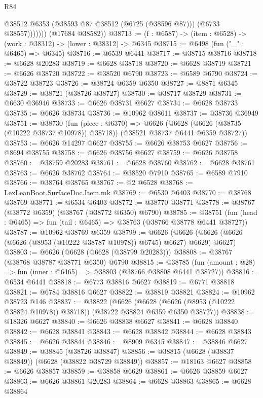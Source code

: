 \begin{lexlean}{R84}
\begin{coremodule}
                  @38512
                  @6353
                  (@38593 @87 @38512 (@6725 (@38596 @87)))
                  (@6733 @38557)))))))
      (@17684 @38582))
@38713 := (f : @6587) -> (item : @6528) -> (work : @38312) -> (lower : @38312) -> @6345
@38715 := @6498 (fun ("_" : @6465) => @6345)
@38716 := @6539 @6441
@38717 := @38715 @38716
@38718 := @6628 @20283
@38719 := @6628 @38718
@38720 := @6628 @38719
@38721 := @6626 @38720
@38722 := @38520 @6790
@38723 := @6589 @6790
@38724 := @38722 @38723
@38726 := @38724 @6359 @6350
@38727 := @8871 @6345
@38729 := @38721 (@38726 @38727)
@38730 := @38717 @38729
@38731 := @6630 @36946
@38733 := @6626 @38731 @6627
@38734 := @6628 @38733
@38735 := @6626 @38734
@38736 := @10962 @38611
@38737 := @38736 @36949
@38751 := @38730
    (fun (piece : @6370) =>
    @6626 (@6628 (@6626 (@38735 (@10222 @38737 @10978)) @38718)) (@38521 @38737 @6441 @6359 @38727))
@38753 := @6626 @14297 @6627
@38755 := @6626 @38753 @6627
@38756 := @8694 @38755
@38758 := @6626 @38756 @6627
@38759 := @6626 @38758
@38760 := @38759 @20283
@38761 := @6628 @38760
@38762 := @6628 @38761
@38763 := @6626 @38762
@38764 := @38520 @7910
@38765 := @6589 @7910
@38766 := @38764 @38765
@38767 := @2 @6528
@38768 := LexLeanBoot.SurfaceDoc.Item.mk
@38769 := @6530 @6403
@38770 := @38768 @38769
@38771 := @6534 @6403
@38772 := @38770 @38771
@38778 := @38767 (@38772 @6359) (@38767 (@38772 @6350) @6790)
@38785 := @38751 (fun (head : @6465) => fun (tail : @6465) => @38763 (@38766 @38778 @6441 @38727))
@38787 := @10962 @38769 @6359
@38799 := @6626
    (@6626 (@6626 (@6626 (@6626 (@8953 (@10222 @38787 @10978)) @6745) @6627) @6629) @6627)
@38803 := @6626 (@6628 (@6628 (@38799 @20283)))
@38808 := @38767 (@38768 @38787 @38771 @6350) @6790
@38815 := @38785 (fun (amount : @28) => fun (inner : @6465) => @38803 (@38766 @38808 @6441 @38727))
@38816 := @6534 @6441
@38818 := @6773 @38816 @6627
@38819 := @6771 @38818
@38821 := @6784 @38816 @6627
@38822 := @38819 @38821
@38824 := @10962 @38723 @146
@38837 := @38822
    (@6626 (@6628 (@6626 (@8953 (@10222 @38824 @10978)) @38718)) (@38722 @38824 @6359 @6350 @38727))
@38838 := @18326 @6627
@38840 := @6626 @38838 @6627
@38841 := @6628 @38840
@38842 := @6628 @38841
@38843 := @6628 @38842
@38844 := @6628 @38843
@38845 := @6626 @38844
@38846 := @8909 @6345
@38847 := @38846 @6627
@38849 := @38845 (@38726 @38847)
@38856 := @38815 (@6628 (@38837 @38849)) (@6628 (@38822 @38729 @38849))
@38857 := @18163 @6627
@38858 := @6626 @38857
@38859 := @38858 @6629
@38861 := @6626 @38859 @6627
@38863 := @6626 @38861 @20283
@38864 := @6628 @38863
@38865 := @6628 @38864

\end{coremodule}
\end{lexlean}
